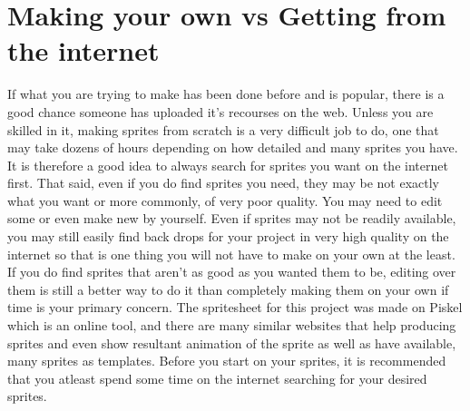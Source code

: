 \documentclass[11pt,fleqn]{book} %
\begin{document}
    
    \section{Making your own vs Getting from the internet}
   If what you are trying to make has been done before and is popular, there is a good chance someone has uploaded it's recourses on the web. Unless you are skilled in it, making sprites from scratch is a very difficult job to do, one that may take dozens of hours depending on how detailed and many sprites you have. It is therefore a good idea to always search for sprites you want on the internet first. That said, even if you do find sprites you need, they may be not exactly what you want or more commonly, of very poor quality. You may need to edit some or even make new by yourself. Even if sprites may not be readily available, you may still easily find back drops for your project in very high quality on the internet so that is one thing you will not have to make on your own at the least. If you do find sprites that aren't as good as you wanted them to be, editing over them is still a better way to do it than completely making them on your own if time is your primary concern. The spritesheet for this project was made on Piskel which is an online tool, and there are many similar websites that help producing sprites and even show resultant animation of the sprite as well as have available, many sprites as templates. Before you start on your sprites, it is recommended that you atleast spend some time on the internet searching for your desired sprites. 
\end{document}
